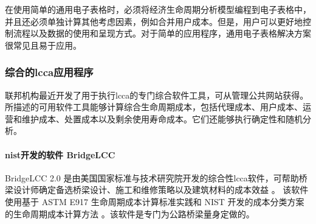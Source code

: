 在使用简单的通用电子表格时，必须将经济生命周期分析模型编程到电子表格中，并且还必须单独计算其他考虑因素，例如合并用户成本。但是，用户可以更好地控制流程以及数据的使用和呈现方式。对于简单的应用程序，通用电子表格解决方案很常见且易于应用。


\subsubsection{综合的\acrlong*{lcca}应用程序}
联邦机构最近开发了用于执行\acrlong*{lcca}的专门综合软件工具，可从管理公共网站获得。所描述的可用软件工具能够计算综合生命周期成本，包括代理成本、用户成本、运营和维护成本、处置成本以及剩余使用寿命成本。它们还能够执行确定性和随机分析。

\paragraph*{\acrfull*{nist}开发的软件 BridgeLCC}
BridgeLCC 2.0 是由美国国家标准与技术研究院开发的综合性\acrlong*{lcca}软件，可帮助桥梁设计师确定备选桥梁设计、施工和维修策略以及建筑材料的成本效益 \cite{ehlen2003b}。 该软件使用基于 ASTM E917 生命周期成本计算标准实践和 NIST 开发的成本分类方案的生命周期成本计算方法 \cite{ehlen2003b}。该软件是专门为公路桥梁量身定做的。

